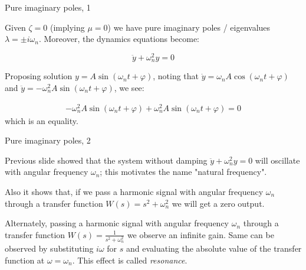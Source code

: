 \documentclass{beamer}
\begin{document}
\begin{frame}{Pure imaginary poles, 1}
	\begin{flushleft}
		
		Given $\zeta = 0$ (implying $\mu = 0$) we have pure imaginary poles / eigenvalues $\lambda = \pm i \omega_n$. Moreover, the dynamics equations become:
		
		\begin{equation}
			\ddot y + \omega_n^2 y = 0
		\end{equation}
		
		Proposing solution $y = A \sin (\omega_n t + \varphi)$, noting that $\dot y = \omega_n A \cos (\omega_n t + \varphi)$ and $\ddot y = -\omega_n^2 A\sin (\omega_n t + \varphi)$, we see:
		
		\begin{align}
			-\omega_n^2 A\sin (\omega_n t + \varphi) + \omega_n^2 A \sin (\omega_n t + \varphi) = 0
		\end{align}
		which is an equality.
		
		
	\end{flushleft}
\end{frame}




\begin{frame}{Pure imaginary poles, 2}
	\begin{flushleft}
		
		Previous slide showed that the system without damping $\ddot y + \omega_n^2 y = 0$ will oscillate with angular frequency $\omega_n$; this motivates the name "natural frequency".
		
		\bigskip
		
		Also it shows that, if we pass a harmonic signal with angular frequency $\omega_n$ through a transfer function $W(s) = s^2 + \omega_n^2$ we will get a zero output.
		
		\bigskip
		
		Alternately, passing a harmonic signal with angular frequency $\omega_n$ through a transfer function $W(s) = \frac{1}{s^2 + \omega_n^2}$ we observe an infinite gain. Same can be observed by substituting $i \omega$ for $s$ and evaluating the absolute value of the transfer function at $\omega = \omega_n$. This effect is called \emph{resonance}.
		
		
	\end{flushleft}
\end{frame}
\end{document}
